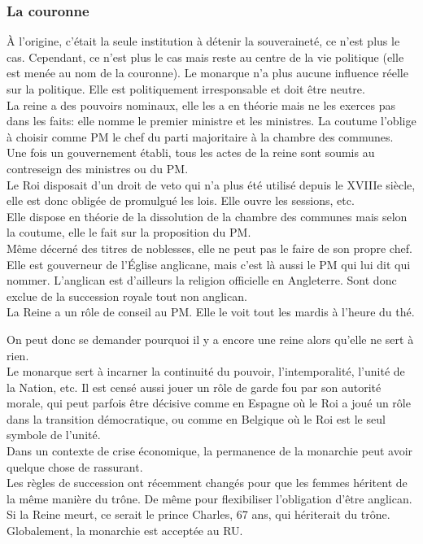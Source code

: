 \documentclass[10pt, a4paper, openany]{book}
\begin{document}
\subsubsection{La couronne}

À l'origine, c'était la seule institution à détenir la souveraineté, ce n'est plus le cas. Cependant, ce n'est plus le cas mais reste au centre de la vie politique (elle est menée au nom de la couronne). Le monarque n'a plus aucune influence réelle sur la politique. Elle est politiquement irresponsable et doit être neutre. \\
La reine a des pouvoirs nominaux, elle les a en théorie mais ne les exerces pas dans les faits: elle nomme le premier ministre et les ministres. La coutume l'oblige à choisir comme PM le chef du parti majoritaire à la chambre des communes. Une fois un gouvernement établi, tous les actes de la reine sont soumis au contreseign des ministres ou du PM. \\
Le Roi disposait d'un droit de veto qui n'a plus été utilisé depuis le XVIIIe siècle, elle est donc obligée de promulgué les lois. Elle ouvre les sessions, etc. \\
Elle dispose en théorie de la dissolution de la chambre des communes mais selon la coutume, elle le fait sur la proposition du PM. \\
Même décerné des titres de noblesses, elle ne peut pas le faire de son propre chef. \\
Elle est gouverneur de l'Église anglicane, mais c'est là aussi le PM qui lui dit qui nommer. L'anglican est d'ailleurs la religion officielle en Angleterre. Sont donc exclue de la succession royale tout non anglican. \\
La Reine a un rôle de conseil au PM. Elle le voit tout les mardis à l'heure du thé. 


On peut donc se demander pourquoi il y a encore une reine alors qu'elle ne sert à rien. \\
Le monarque sert à incarner la continuité du pouvoir, l'intemporalité, l'unité de la Nation, etc. Il est censé aussi jouer un rôle de garde fou par son autorité morale, qui peut parfois être décisive comme en Espagne où le Roi a joué un rôle dans la transition démocratique, ou comme en Belgique où le Roi est le seul symbole de l'unité. \\
Dans un contexte de crise économique, la permanence de la monarchie peut avoir quelque chose de rassurant. \\
Les règles de succession ont récemment changés pour que les femmes héritent de la même manière du trône. De même pour flexibiliser l'obligation d'être anglican. \\
Si la Reine meurt, ce serait le prince Charles, 67 ans, qui hériterait du trône. \\
Globalement, la monarchie est acceptée au RU. 
\end{document}
